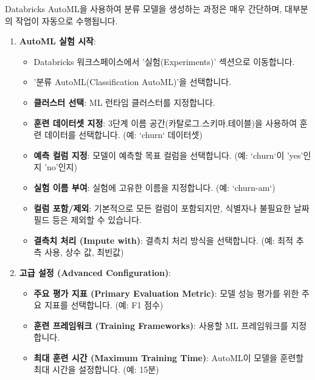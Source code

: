 \documentclass[11pt,a4paper]{article}
\begin{document}
\begin{itemize}
\begin{itemize}
\begin{itemize}
\begin{itemize}
\begin{itemize}
Databricks AutoML을 사용하여 분류 모델을 생성하는 과정은 매우 간단하며, 대부분의 작업이 자동으로 수행됩니다.

\begin{enumerate}
    \item \textbf{AutoML 실험 시작}:
    \begin{itemize}
        \item Databricks 워크스페이스에서 '실험(Experiments)' 섹션으로 이동합니다.
        \item '분류 AutoML(Classification AutoML)'을 선택합니다.
        \item \textbf{클러스터 선택}: ML 런타임 클러스터를 지정합니다.
        \item \textbf{훈련 데이터셋 지정}: 3단계 이름 공간(카탈로그.스키마.테이블)을 사용하여 훈련 데이터를 선택합니다. (예: `churn` 데이터셋)
        \item \textbf{예측 컬럼 지정}: 모델이 예측할 목표 컬럼을 선택합니다. (예: `churn`이 'yes'인지 'no'인지)
        \item \textbf{실험 이름 부여}: 실험에 고유한 이름을 지정합니다. (예: `churn-am`)
        \item \textbf{컬럼 포함/제외}: 기본적으로 모든 컬럼이 포함되지만, 식별자나 불필요한 날짜 필드 등은 제외할 수 있습니다.
        \item \textbf{결측치 처리 (Impute with)}: 결측치 처리 방식을 선택합니다. (예: 최적 추측 사용, 상수 값, 최빈값)
    \end{itemize}

    \item \textbf{고급 설정 (Advanced Configuration)}:
    \begin{itemize}
        \item \textbf{주요 평가 지표 (Primary Evaluation Metric)}: 모델 성능 평가를 위한 주요 지표를 선택합니다. (예: F1 점수)
        \item \textbf{훈련 프레임워크 (Training Frameworks)}: 사용할 ML 프레임워크를 지정합니다.
        \item \textbf{최대 훈련 시간 (Maximum Training Time)}: AutoML이 모델을 훈련할 최대 시간을 설정합니다. (예: 15분)
    \end{itemize}


\end{enumerate}
\end{itemize}
\end{itemize}
\end{itemize}
\end{itemize}
\end{itemize}
\end{document}
